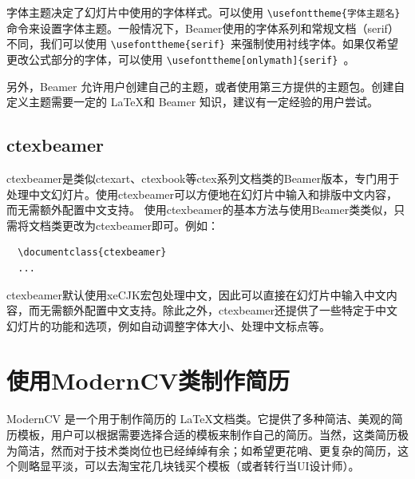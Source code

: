 字体主题决定了幻灯片中使用的字体样式。可以使用  \texttt{\textbackslash usefonttheme\{字体主题名\} } 命令来设置字体主题。一般情况下，Beamer使用的字体系列和常规文档（serif）不同，我们可以使用 \texttt{\textbackslash usefonttheme\{serif\} }来强制使用衬线字体。如果仅希望更改公式部分的字体，可以使用 \texttt{\textbackslash usefonttheme[onlymath]\{serif\} }。

另外，Beamer 允许用户创建自己的主题，或者使用第三方提供的主题包。创建自定义主题需要一定的  \LaTeX  和 Beamer 知识，建议有一定经验的用户尝试。

\subsection{ctexbeamer}

ctexbeamer是类似ctexart、ctexbook等ctex系列文档类的Beamer版本，专门用于处理中文幻灯片。使用ctexbeamer可以方便地在幻灯片中输入和排版中文内容，而无需额外配置中文支持。 使用ctexbeamer的基本方法与使用Beamer类类似，只需将文档类更改为ctexbeamer即可。例如：
\begin{verbatim}
  \documentclass{ctexbeamer}
  ...
\end{verbatim}

ctexbeamer默认使用xeCJK宏包处理中文，因此可以直接在幻灯片中输入中文内容，而无需额外配置中文支持。除此之外，ctexbeamer还提供了一些特定于中文幻灯片的功能和选项，例如自动调整字体大小、处理中文标点等。




\section{使用ModernCV类制作简历}

ModernCV 是一个用于制作简历的  \LaTeX  文档类。它提供了多种简洁、美观的简历模板，用户可以根据需要选择合适的模板来制作自己的简历。当然，这类简历极为简洁，然而对于技术类岗位也已经绰绰有余；如希望更花哨、更复杂的简历，这个则略显平淡，可以去淘宝花几块钱买个模板（或者转行当UI设计师）。

